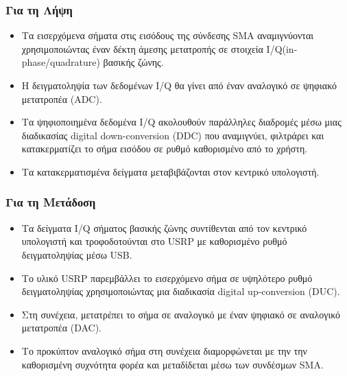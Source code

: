 \documentclass[12pt]{report}
\begin{document}
            \subsubsection*{\textsf{Για τη Λήψη}}
            \begin{itemize}
                \item Τα εισερχόμενα σήματα στις εισόδους της σύνδεσης SMA
                αναμιγνύονται χρησιμοποιώντας έναν δέκτη άμεσης μετατροπής σε
                στοιχεία I/Q(in-phase/quadrature) βασικής ζώνης.
                \item Η δειγματοληψία των δεδομένων I/Q θα γίνει από έναν αναλογικό
                σε ψηφιακό μετατροπέα (ADC).
                \item Τα ψηφιοποιημένα δεδομένα I/Q ακολουθούν παράλληλες διαδρομές
                μέσω μιας διαδικασίας digital down-conversion (DDC) που αναμιγνύει,
                φιλτράρει και κατακερματίζει το σήμα εισόδου σε ρυθμό καθορισμένο
                από το χρήστη.
                \item Τα κατακερματισμένα δείγματα μεταβιβάζονται στον κεντρικό
                υπολογιστή.
            \end{itemize}
            \subsubsection*{\textsf{Για τη Μετάδοση}}
                \begin{itemize}
                    \item Τα δείγματα I/Q σήματος βασικής ζώνης συντίθενται από τον
                    κεντρικό υπολογιστή και τροφοδοτούνται στο USRP με καθορισμένο
                    ρυθμό δειγματοληψίας μέσω USB.
                    \item Το υλικό USRP παρεμβάλλει το εισερχόμενο σήμα σε υψηλότερο
                    ρυθμό δειγματοληψίας χρησιμοποιώντας μια διαδικασία digital
                    up-conversion (DUC).
                    \item Στη συνέχεια, μετατρέπει το σήμα σε αναλογικό με έναν 
                    ψηφιακό σε αναλογικό μετατροπέα (DAC).
                    \item Το προκύπτον αναλογικό σήμα στη συνέχεια διαμορφώνεται με την
                    την καθορισμένη συχνότητα φορέα και μεταδίδεται μέσω των συνδέσμων
                    SMA.
                \end{itemize}
    
\end{document}
